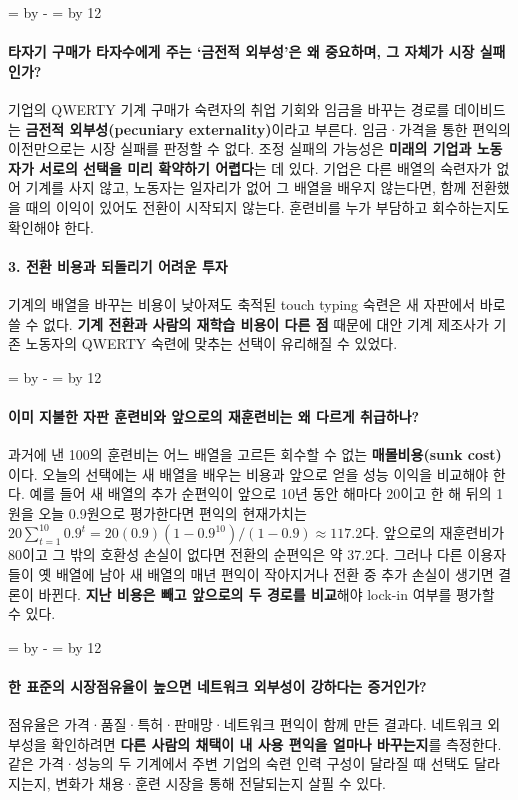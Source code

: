 \documentclass[10pt,a4paper]{article}
\newcommand{\ReserveQuestionSpace}{%
  \par\begingroup
  \dimen0=\pagegoal \advance\dimen0 by -\pagetotal
  \dimen2=\baselineskip \multiply\dimen2 by 12
  \ifdim\dimen0<\dimen2 \newpage\fi
  \endgroup}
\begin{document}
\ReserveQuestionSpace
\paragraph{타자기 구매가 타자수에게 주는 ‘금전적 외부성’은 왜 중요하며, 그 자체가 시장 실패인가?}
기업의 QWERTY 기계 구매가 숙련자의 취업 기회와 임금을 바꾸는 경로를 데이비드는 \textbf{금전적 외부성(pecuniary externality)}이라고 부른다. 임금·가격을 통한 편익의 이전만으로는 시장 실패를 판정할 수 없다. 조정 실패의 가능성은 \textbf{미래의 기업과 노동자가 서로의 선택을 미리 확약하기 어렵다}는 데 있다. 기업은 다른 배열의 숙련자가 없어 기계를 사지 않고, 노동자는 일자리가 없어 그 배열을 배우지 않는다면, 함께 전환했을 때의 이익이 있어도 전환이 시작되지 않는다. 훈련비를 누가 부담하고 회수하는지도 확인해야 한다.\par

\paragraph{3. 전환 비용과 되돌리기 어려운 투자}

기계의 배열을 바꾸는 비용이 낮아져도 축적된 touch typing 숙련은 새 자판에서 바로 쓸 수 없다. \textbf{기계 전환과 사람의 재학습 비용이 다른 점} 때문에 대안 기계 제조사가 기존 노동자의 QWERTY 숙련에 맞추는 선택이 유리해질 수 있었다.\par

\ReserveQuestionSpace
\paragraph{이미 지불한 자판 훈련비와 앞으로의 재훈련비는 왜 다르게 취급하나?}
과거에 낸 100의 훈련비는 어느 배열을 고르든 회수할 수 없는 \textbf{매몰비용(sunk cost)}이다. 오늘의 선택에는 새 배열을 배우는 비용과 앞으로 얻을 성능 이익을 비교해야 한다. 예를 들어 새 배열의 추가 순편익이 앞으로 10년 동안 해마다 20이고 한 해 뒤의 1원을 오늘 0.9원으로 평가한다면 편익의 현재가치는 $20\sum_{t=1}^{10}0.9^t=20(0.9)(1-0.9^{10})/(1-0.9)\approx117.2$다. 앞으로의 재훈련비가 80이고 그 밖의 호환성 손실이 없다면 전환의 순편익은 약 37.2다. 그러나 다른 이용자들이 옛 배열에 남아 새 배열의 매년 편익이 작아지거나 전환 중 추가 손실이 생기면 결론이 바뀐다. \textbf{지난 비용은 빼고 앞으로의 두 경로를 비교}해야 lock-in 여부를 평가할 수 있다.\par

\ReserveQuestionSpace
\paragraph{한 표준의 시장점유율이 높으면 네트워크 외부성이 강하다는 증거인가?}
점유율은 가격·품질·특허·판매망·네트워크 편익이 함께 만든 결과다. 네트워크 외부성을 확인하려면 \textbf{다른 사람의 채택이 내 사용 편익을 얼마나 바꾸는지}를 측정한다. 같은 가격·성능의 두 기계에서 주변 기업의 숙련 인력 구성이 달라질 때 선택도 달라지는지, 변화가 채용·훈련 시장을 통해 전달되는지 살필 수 있다.\par
\end{document}
